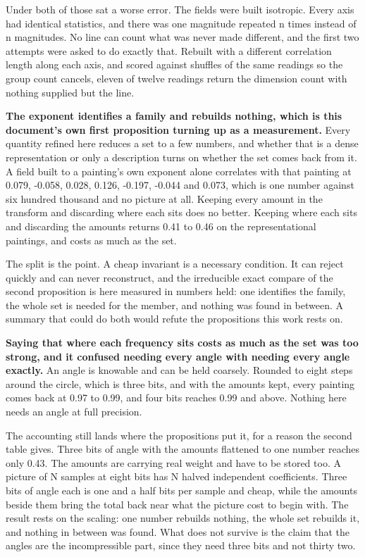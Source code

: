 Under both of those sat a worse error. The fields were built isotropic. Every axis had identical statistics, and there was one magnitude repeated n times instead of n magnitudes. No line can count what was never made different, and the first two attempts were asked to do exactly that. Rebuilt with a different correlation length along each axis, and scored against shuffles of the same readings so the group count cancels, eleven of twelve readings return the dimension count with nothing supplied but the line.

\textbf{The exponent identifies a family and rebuilds nothing, which is this document's own first proposition turning up as a measurement.} Every quantity refined here reduces a set to a few numbers, and whether that is a dense representation or only a description turns on whether the set comes back from it. A field built to a painting's own exponent alone correlates with that painting at 0.079, -0.058, 0.028, 0.126, -0.197, -0.044 and 0.073, which is one number against six hundred thousand and no picture at all. Keeping every amount in the transform and discarding where each sits does no better. Keeping where each sits and discarding the amounts returns 0.41 to 0.46 on the representational paintings, and costs as much as the set.

The split is the point. A cheap invariant is a necessary condition. It can reject quickly and can never reconstruct, and the irreducible exact compare of the second proposition is here measured in numbers held: one identifies the family, the whole set is needed for the member, and nothing was found in between. A summary that could do both would refute the propositions this work rests on.

\textbf{Saying that where each frequency sits costs as much as the set was too strong, and it confused needing every angle with needing every angle exactly.} An angle is knowable and can be held coarsely. Rounded to eight steps around the circle, which is three bits, and with the amounts kept, every painting comes back at 0.97 to 0.99, and four bits reaches 0.99 and above. Nothing here needs an angle at full precision.

The accounting still lands where the propositions put it, for a reason the second table gives. Three bits of angle with the amounts flattened to one number reaches only 0.43. The amounts are carrying real weight and have to be stored too. A picture of N samples at eight bits has N halved independent coefficients. Three bits of angle each is one and a half bits per sample and cheap, while the amounts beside them bring the total back near what the picture cost to begin with. The result rests on the scaling: one number rebuilds nothing, the whole set rebuilds it, and nothing in between was found. What does not survive is the claim that the angles are the incompressible part, since they need three bits and not thirty two.

